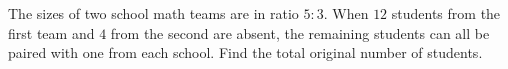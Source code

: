 The sizes of two school math teams are in ratio $5:3$. When $12$ students from the first team and $4$ from the second are absent, the remaining students can all be paired with one from each school. Find the total original number of students.

